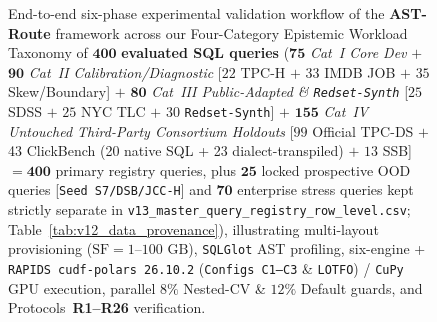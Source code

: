 \documentclass[10pt,a4paper]{article}
\begin{document}
\begin{figure}[t!]
{%
}
\caption{End-to-end six-phase experimental validation workflow of the \textbf{AST-Route} framework across our Four-Category Epistemic Workload Taxonomy of $\mathbf{400}$ \textbf{evaluated SQL queries} ($\mathbf{75}$ \emph{Cat~I Core Dev} $+$ $\mathbf{90}$ \emph{Cat~II Calibration/Diagnostic} [$22$ TPC-H $+$ $33$ IMDB JOB $+$ $35$ Skew/Boundary] $+$ $\mathbf{80}$ \emph{Cat~III Public-Adapted \& \texttt{Redset-Synth}} [$25$ SDSS $+$ $25$ NYC TLC $+$ $30$ \texttt{Redset-Synth}] $+$ $\mathbf{155}$ \emph{Cat~IV Untouched Third-Party Consortium Holdouts} [$99$ Official TPC-DS $+$ 43 ClickBench (20 native SQL + 23 dialect-transpiled) $+$ $13$ SSB] $= \mathbf{400}$ primary registry queries, plus $\mathbf{25}$ locked prospective OOD queries [\texttt{Seed~S7/DSB/JCC-H}] and $\mathbf{70}$ enterprise stress queries kept strictly separate in \texttt{v13\_\allowbreak{}master\_\allowbreak{}query\_\allowbreak{}registry\_\allowbreak{}row\_\allowbreak{}level.csv}; Table~\ref{tab:v12_data_provenance}), illustrating multi-layout provisioning ($\text{SF}=1\text{--}100\text{ GB}$), \texttt{SQLGlot} AST profiling, six-engine + \texttt{RAPIDS cudf-polars 26.10.2} (\texttt{Configs C1--C3} \& \texttt{LOTFO}) / \texttt{CuPy} GPU execution, parallel $8\%$ Nested-CV \& $12\%$ Default guards, and Protocols~\textbf{R1--R26} verification.}
\label{fig:experimental_workflow}
\end{figure}


\end{document}
